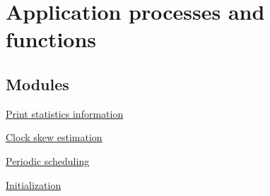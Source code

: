 \hypertarget{group__glossy-test-processes}{
\section{Application processes and functions}
\label{group__glossy-test-processes}
}
\subsection*{Modules}
\begin{DoxyCompactItemize}
\item 
\hyperlink{group__glossy-test-print-stats}{Print statistics information}
\item 
\hyperlink{group__glossy-test-skew}{Clock skew estimation}
\item 
\hyperlink{group__glossy-test-scheduler}{Periodic scheduling}
\item 
\hyperlink{group__glossy-test-init}{Initialization}
\end{DoxyCompactItemize}
